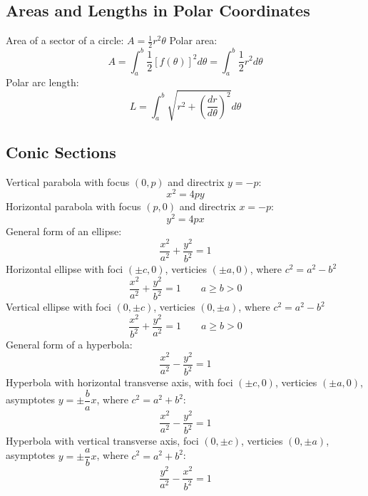 \documentclass{article}
\begin{document}
    \subsection{Areas and Lengths in Polar Coordinates}
    \begin{outline}
        \1 Area of a sector of a circle: \(A=\frac{1}{2}r^2\theta\)
        \1 Polar area: \[A=\int^b_a\frac{1}{2}[f(\theta)]^2d\theta=\int^b_a\frac{1}{2}r^2d\theta\]
        \1 Polar arc length: \[L=\int^b_a\sqrt{r^2+\left(\dfrac{dr}{d\theta}\right)^2}d\theta\]
    \end{outline}
    \subsection{Conic Sections}
    \begin{outline}
        \1 Vertical parabola with focus \((0,p)\) and directrix \(y=-p\): \[x^2=4py\]
        \1 Horizontal parabola with focus \((p,0)\) and directrix \(x=-p\): \[y^2=4px\]
        \1 General form of an ellipse: \[\dfrac{x^2}{a^2}+\dfrac{y^2}{b^2}=1\]
        \1 Horizontal ellipse with foci \((\pm c,0)\), verticies \((\pm a,0)\), where \(c^2=a^2-b^2\) \[\dfrac{x^2}{a^2}+\dfrac{y^2}{b^2}=1\qquad a\geq b>0\]
        \1 Vertical ellipse with foci \((0,\pm c)\), verticies \((0,\pm a)\), where \(c^2=a^2-b^2\) \[\dfrac{x^2}{b^2}+\dfrac{y^2}{a^2}=1\qquad a\geq b>0\]
        \1 General form of a hyperbola: \[\dfrac{x^2}{a^2}-\dfrac{y^2}{b^2}=1\]
        \1 Hyperbola with horizontal transverse axis, with foci \((\pm c,0)\), verticies \((\pm a,0)\), asymptotes \(y=\pm\dfrac{b}{a}x\), where \(c^2=a^2+b^2\): \[\dfrac{x^2}{a^2}-\dfrac{y^2}{b^2}=1\]
        \1 Hyperbola with vertical transverse axis, foci \((0,\pm c)\), verticies \((0,\pm a)\), asymptotes \(y=\pm\dfrac{a}{b}x\), where \(c^2=a^2+b^2\): \[\dfrac{y^2}{a^2}-\dfrac{x^2}{b^2}=1\]

    \end{outline}
\end{document}

